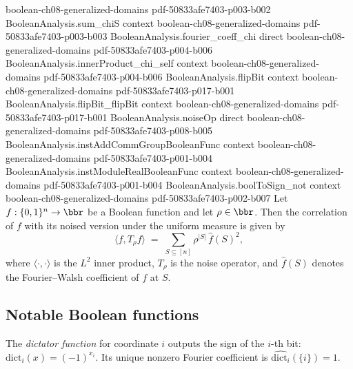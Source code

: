 \begin{theorem}
  {boolean-ch08-generalized-domains}
  {pdf-50833afe7403-p003-b002}
\proofstep
  {BooleanAnalysis.sum_chiS}
  {context}
  {boolean-ch08-generalized-domains}
  {pdf-50833afe7403-p003-b003}
\proofstep
  {BooleanAnalysis.fourier_coeff_chi}
  {direct}
  {boolean-ch08-generalized-domains}
  {pdf-50833afe7403-p004-b006}
\proofstep
  {BooleanAnalysis.innerProduct_chi_self}
  {context}
  {boolean-ch08-generalized-domains}
  {pdf-50833afe7403-p004-b006}
\proofstep
  {BooleanAnalysis.flipBit}
  {context}
  {boolean-ch08-generalized-domains}
  {pdf-50833afe7403-p017-b001}
\proofstep
  {BooleanAnalysis.flipBit_flipBit}
  {context}
  {boolean-ch08-generalized-domains}
  {pdf-50833afe7403-p017-b001}
\proofstep
  {BooleanAnalysis.noiseOp}
  {direct}
  {boolean-ch08-generalized-domains}
  {pdf-50833afe7403-p008-b005}
\proofstep
  {BooleanAnalysis.instAddCommGroupBooleanFunc}
  {context}
  {boolean-ch08-generalized-domains}
  {pdf-50833afe7403-p001-b004}
\proofstep
  {BooleanAnalysis.instModuleRealBooleanFunc}
  {context}
  {boolean-ch08-generalized-domains}
  {pdf-50833afe7403-p001-b004}
\proofstep
  {BooleanAnalysis.boolToSign_not}
  {context}
  {boolean-ch08-generalized-domains}
  {pdf-50833afe7403-p002-b007}
Let $f : \{0,1\}^n \to \bbr$ be a Boolean function and let $\rho \in \bbr$. Then the
correlation of $f$ with its noised version under the uniform measure is given by
\[
  \langle f, T_\rho f\rangle \;=\; \sum_{S\subseteq[n]} \rho^{|S|}\,\hat f(S)^2,
\]
where $\langle\cdot,\cdot\rangle$ is the $L^2$ inner product, $T_\rho$ is the noise
operator, and $\hat f(S)$ denotes the Fourier--Walsh coefficient of $f$ at $S$.
\end{theorem}

\subsection{Notable Boolean functions}

\begin{definition}[Dictator]
\label{BooleanAnalysis.dictator}
\leanok
{}
The \emph{dictator function} for coordinate $i$ outputs the sign of the $i$-th
bit: $\mathrm{dict}_i(x) = (-1)^{x_i}$.  Its unique nonzero Fourier coefficient
is $\widehat{\mathrm{dict}_i}(\{i\}) = 1$.
\end{definition}

